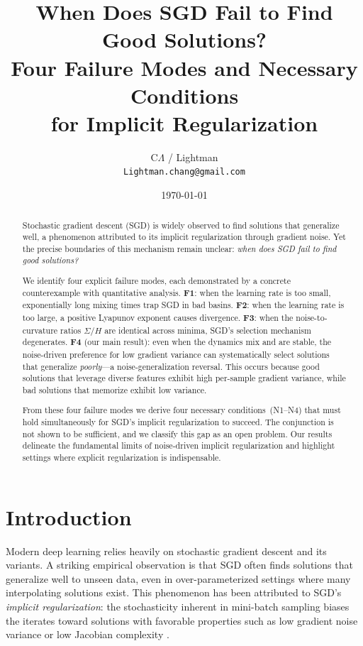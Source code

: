 \documentclass[11pt,a4paper]{article}
\title{When Does SGD Fail to Find Good Solutions?\\
Four Failure Modes and Necessary Conditions\\
for Implicit Regularization}
\author{C$\Lambda$ / Lightman\\
\texttt{Lightman.chang@gmail.com}}
\date{\today}
\begin{document}
\maketitle

\begin{abstract}
Stochastic gradient descent (SGD) is widely observed to find solutions that
generalize well, a phenomenon attributed to its implicit regularization through
gradient noise.  Yet the precise boundaries of this mechanism remain unclear:
\emph{when does SGD fail to find good solutions?}

We identify four explicit failure modes, each demonstrated by a concrete
counterexample with quantitative analysis.
\textbf{F1}: when the learning rate is too small, exponentially long mixing
times trap SGD in bad basins.
\textbf{F2}: when the learning rate is too large, a positive Lyapunov exponent
causes divergence.
\textbf{F3}: when the noise-to-curvature ratios $\Sigma/H$ are identical
across minima, SGD's selection mechanism degenerates.
\textbf{F4} (our main result): even when the dynamics mix and are stable, the
noise-driven preference for low gradient variance can systematically select
solutions that generalize \emph{poorly}---a noise-generalization reversal.
This occurs because good solutions that leverage diverse features exhibit
high per-sample gradient variance, while bad solutions that memorize exhibit
low variance.

From these four failure modes we derive four necessary conditions~(N1--N4)
that must hold simultaneously for SGD's implicit regularization to succeed.
The conjunction is not shown to be sufficient, and we classify this gap as
an open problem.  Our results delineate the fundamental limits of noise-driven
implicit regularization and highlight settings where explicit regularization
is indispensable.
\end{abstract}

\section{Introduction}
\label{sec:intro}

Modern deep learning relies heavily on stochastic gradient descent and its
variants.  A striking empirical observation is that SGD often finds solutions
that generalize well to unseen data, even in over-parameterized settings where
many interpolating solutions exist.  This phenomenon has been attributed to
SGD's \emph{implicit regularization}: the stochasticity inherent in
mini-batch sampling biases the iterates toward solutions with favorable
properties such as low gradient noise variance or low Jacobian complexity
\citep{smith2018dont,chaudhari2018stochastic,li2021happens}.
\end{document}
